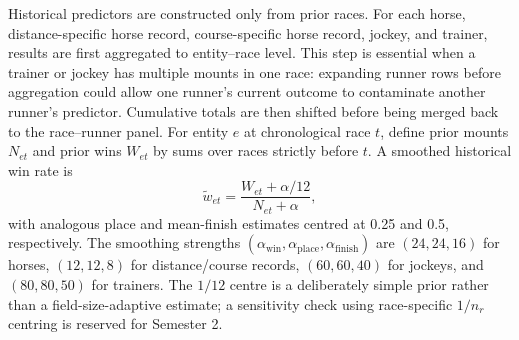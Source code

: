 Historical predictors are constructed only from prior races. For each horse, distance-specific horse record, course-specific horse record, jockey, and trainer, results are first aggregated to entity--race level. This step is essential when a trainer or jockey has multiple mounts in one race: expanding runner rows before aggregation could allow one runner's current outcome to contaminate another runner's predictor. Cumulative totals are then shifted before being merged back to the race--runner panel. For entity $e$ at chronological race $t$, define prior mounts $N_{et}$ and prior wins $W_{et}$ by sums over races strictly before $t$. A smoothed historical win rate is
\begin{equation}
\widetilde{w}_{et}=\frac{W_{et}+\alpha/12}{N_{et}+\alpha},
\label{eq:smoothed-rate}
\end{equation}
with analogous place and mean-finish estimates centred at 0.25 and 0.5, respectively. The smoothing strengths $(\alpha_{\mathrm{win}},\alpha_{\mathrm{place}},\alpha_{\mathrm{finish}})$ are $(24,24,16)$ for horses, $(12,12,8)$ for distance/course records, $(60,60,40)$ for jockeys, and $(80,80,50)$ for trainers. The $1/12$ centre is a deliberately simple prior rather than a field-size-adaptive estimate; a sensitivity check using race-specific $1/n_r$ centring is reserved for Semester 2.

